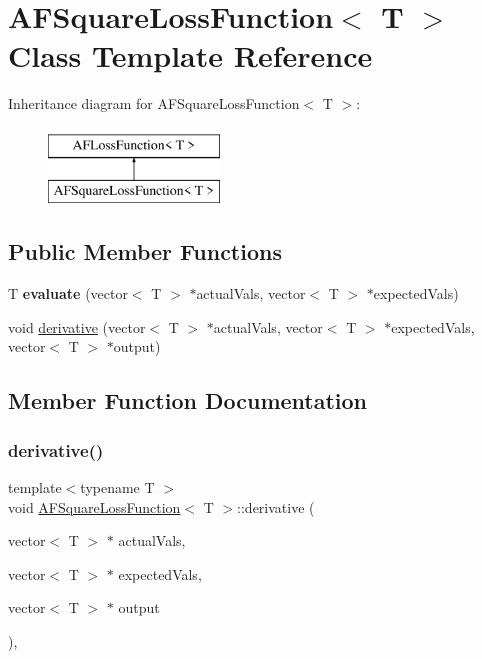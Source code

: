 \hypertarget{classAFSquareLossFunction}{}\section{A\+F\+Square\+Loss\+Function$<$ T $>$ Class Template Reference}
\label{classAFSquareLossFunction}
Inheritance diagram for A\+F\+Square\+Loss\+Function$<$ T $>$\+:\begin{figure}[H]
\begin{center}
\leavevmode
\includegraphics[height=2.000000cm]{classAFSquareLossFunction}
\end{center}
\end{figure}
\subsection*{Public Member Functions}
\begin{DoxyCompactItemize}
\item 
\mbox{\label{classAFSquareLossFunction_a6bf89d61174eae853b603615a7e280a8}} 
T {\bfseries evaluate} (vector$<$ T $>$ $\ast$actual\+Vals, vector$<$ T $>$ $\ast$expected\+Vals)
\item 
void \hyperlink{classAFSquareLossFunction_abba069bd0b248fe89641673844b06616}{derivative} (vector$<$ T $>$ $\ast$actual\+Vals, vector$<$ T $>$ $\ast$expected\+Vals, vector$<$ T $>$ $\ast$output)
\end{DoxyCompactItemize}


\subsection{Member Function Documentation}
\mbox{\label{classAFSquareLossFunction_abba069bd0b248fe89641673844b06616}} 
\subsubsection{\texorpdfstring{derivative()}{derivative()}}
{\footnotesize\ttfamily template$<$typename T $>$ \\
void \hyperlink{classAFSquareLossFunction}{A\+F\+Square\+Loss\+Function}$<$ T $>$\+::derivative (\begin{DoxyParamCaption}\item[{vector$<$ T $>$ $\ast$}]{actual\+Vals,  }\item[{vector$<$ T $>$ $\ast$}]{expected\+Vals,  }\item[{vector$<$ T $>$ $\ast$}]{output }\end{DoxyParamCaption})\hspace{0.3cm}{\ttfamily [inline]}, {\ttfamily [virtual]}}

